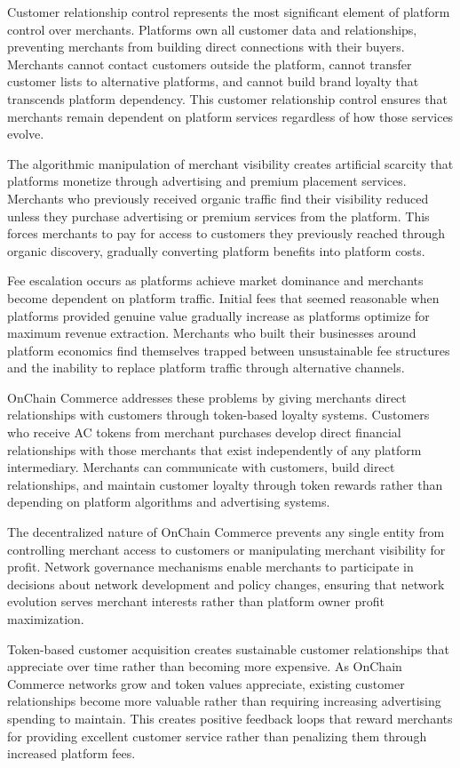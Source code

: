 \documentclass[
  Letterpaper,
]{scrbook}
\begin{document}
Customer relationship control represents the most significant element of
platform control over merchants. Platforms own all customer data and
relationships, preventing merchants from building direct connections
with their buyers. Merchants cannot contact customers outside the
platform, cannot transfer customer lists to alternative platforms, and
cannot build brand loyalty that transcends platform dependency. This
customer relationship control ensures that merchants remain dependent on
platform services regardless of how those services evolve.

The algorithmic manipulation of merchant visibility creates artificial
scarcity that platforms monetize through advertising and premium
placement services. Merchants who previously received organic traffic
find their visibility reduced unless they purchase advertising or
premium services from the platform. This forces merchants to pay for
access to customers they previously reached through organic discovery,
gradually converting platform benefits into platform costs.

Fee escalation occurs as platforms achieve market dominance and
merchants become dependent on platform traffic. Initial fees that seemed
reasonable when platforms provided genuine value gradually increase as
platforms optimize for maximum revenue extraction. Merchants who built
their businesses around platform economics find themselves trapped
between unsustainable fee structures and the inability to replace
platform traffic through alternative channels.

OnChain Commerce addresses these problems by giving merchants direct
relationships with customers through token-based loyalty systems.
Customers who receive AC tokens from merchant purchases develop direct
financial relationships with those merchants that exist independently of
any platform intermediary. Merchants can communicate with customers,
build direct relationships, and maintain customer loyalty through token
rewards rather than depending on platform algorithms and advertising
systems.

The decentralized nature of OnChain Commerce prevents any single entity
from controlling merchant access to customers or manipulating merchant
visibility for profit. Network governance mechanisms enable merchants to
participate in decisions about network development and policy changes,
ensuring that network evolution serves merchant interests rather than
platform owner profit maximization.

Token-based customer acquisition creates sustainable customer
relationships that appreciate over time rather than becoming more
expensive. As OnChain Commerce networks grow and token values
appreciate, existing customer relationships become more valuable rather
than requiring increasing advertising spending to maintain. This creates
positive feedback loops that reward merchants for providing excellent
customer service rather than penalizing them through increased platform
fees.
\end{document}
